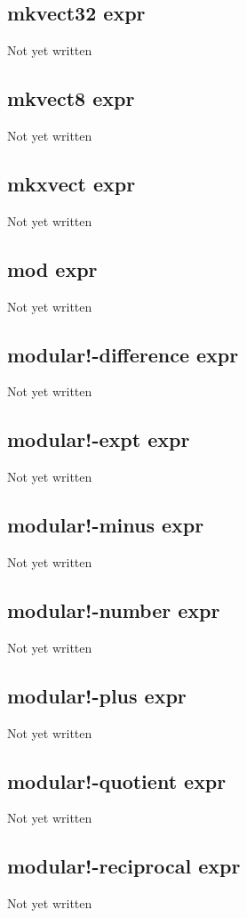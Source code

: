 \documentclass[a4paper,11pt]{article}
\begin{document}
\subsection{\ttfamily mkvect32 expr}
Not yet written

\subsection{\ttfamily mkvect8 expr}
Not yet written

\subsection{\ttfamily mkxvect expr}
Not yet written

\subsection{\ttfamily mod expr}
Not yet written

\subsection{\ttfamily modular!-difference expr}
Not yet written

\subsection{\ttfamily modular!-expt expr}
Not yet written

\subsection{\ttfamily modular!-minus expr}
Not yet written

\subsection{\ttfamily modular!-number expr}
Not yet written

\subsection{\ttfamily modular!-plus expr}
Not yet written

\subsection{\ttfamily modular!-quotient expr}
Not yet written

\subsection{\ttfamily modular!-reciprocal expr}
Not yet written
\end{document}

